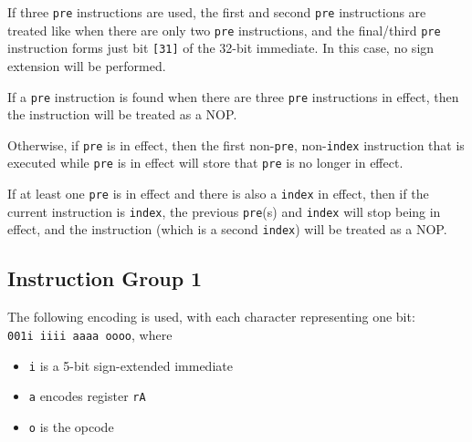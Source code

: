 \documentclass{article}
\begin{document}
	If three \texttt{pre} instructions are used, the first and second
	\texttt{pre} instructions are treated like when there are only two
	\texttt{pre} instructions, and the final/third \texttt{pre} instruction
	forms just bit \texttt{[31]} of the 32-bit immediate.  In this case, no
	sign extension will be performed.


	If a \texttt{pre} instruction is found when there are three
	\texttt{pre} instructions in effect, then the instruction will be
	treated as a NOP.

	Otherwise, if \texttt{pre} is in effect, then the first
	non-\texttt{pre}, non-\texttt{index} instruction that is executed while
	\texttt{pre} is in effect will store that \texttt{pre} is no longer in
	effect.

	If at least one \texttt{pre} is in effect and there is also a
	\texttt{index} in effect, then if the current instruction is
	\texttt{index}, the previous \texttt{pre}(s) and \texttt{index} will
	stop being in effect, and the instruction (which is a second
	\texttt{index}) will be treated as a NOP.




	\subsection{Instruction Group 1}
	The following encoding is used, with each character representing one
	bit:  \\
	\texttt{001i iiii aaaa oooo}, where

	\singlespacing
	\begin{itemize}
		\item \texttt{i} is a 5-bit sign-extended immediate
		\item \texttt{a} encodes register \texttt{rA}
		\item \texttt{o} is the opcode
	\end{itemize}
	\doublespacing
\end{document}
